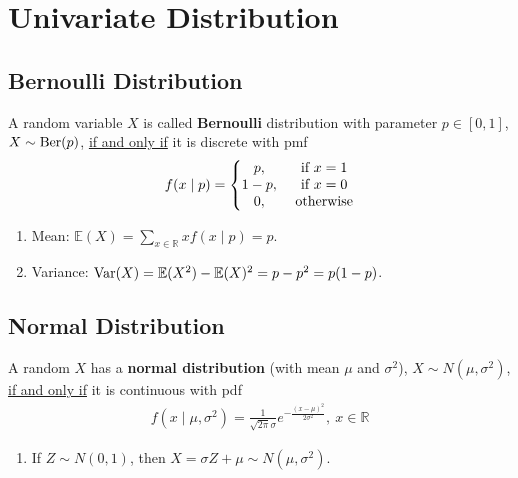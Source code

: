 \documentclass[11pt]{elegantbook}
\begin{document}
\section{Univariate Distribution}
\subsection{Bernoulli Distribution}
\begin{definition}
    \normalfont
    A random variable $X$ is called \textbf{Bernoulli} distribution with parameter $p\in[0,1]$, $X\sim \textnormal{Ber}(p)$, \underline{if and only if} it is discrete with pmf
    \begin{equation}
        \begin{aligned}
            f(x\mid p)=\left\{\begin{matrix}
                p,&\textnormal{ if }x=1\\
                1-p,&\textnormal{ if }x=0\\
                0,&\textnormal{ otherwise}
            \end{matrix}\right.
        \end{aligned}
        \nonumber
    \end{equation}
\end{definition}
\begin{enumerate}[$\circ$]
    \item Mean: $\mathbb{E}(X)=\sum_{x\in \mathbb{R}}x f(x\mid p)=p$.
    \item Variance: $\textnormal{Var}(X)=\mathbb{E}(X^2)-\mathbb{E}(X)^2=p-p^2=p(1-p)$.
\end{enumerate}

\subsection{Normal Distribution}
\begin{definition}
    \normalfont
    A random $X$ has a \textbf{normal distribution} (with mean $\mu$ and $\sigma^2$), $X\sim N(\mu,\sigma^2)$, \underline{if and only if} it is continuous with pdf
    \begin{equation}
        \begin{aligned}
            f(x\mid \mu,\sigma^2)=\frac{1}{\sqrt{2\pi}\sigma}e^{-\frac{(x-\mu)^2}{2\sigma^2}},\ x\in \mathbb{R}
        \end{aligned}
        \nonumber
    \end{equation}
\end{definition}
\begin{enumerate}[$\circ$]
    \item If $Z\sim N(0,1)$, then $X=\sigma Z+\mu \sim N(\mu,\sigma^2)$.
\end{enumerate}
\end{document}
